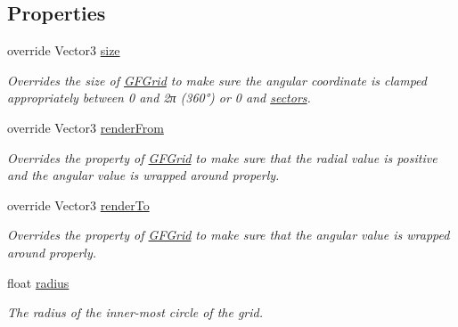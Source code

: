\subsection*{Properties}
\begin{DoxyCompactItemize}
\item 
override Vector3 \hyperlink{class_g_f_polar_grid_a851ff16bfbf1204a1ab0b1b4de3ceb35_a851ff16bfbf1204a1ab0b1b4de3ceb35}{size}
\begin{DoxyCompactList}\small\item\em Overrides the size of \hyperlink{class_g_f_grid}{G\+F\+Grid} to make sure the angular coordinate is clamped appropriately between 0 and 2π (360°) or 0 and \hyperlink{class_g_f_polar_grid_a10ed1b65007dca14afb8fb6d22d36de0_a10ed1b65007dca14afb8fb6d22d36de0}{sectors}.\end{DoxyCompactList}\item 
override Vector3 \hyperlink{class_g_f_polar_grid_a9f4b9bcd687f29d56f4aafa74655e27b_a9f4b9bcd687f29d56f4aafa74655e27b}{render\+From}
\begin{DoxyCompactList}\small\item\em Overrides the property of \hyperlink{class_g_f_grid}{G\+F\+Grid} to make sure that the radial value is positive and the angular value is wrapped around properly.\end{DoxyCompactList}\item 
override Vector3 \hyperlink{class_g_f_polar_grid_a81cc21991e689a1e74821d1f2870852e_a81cc21991e689a1e74821d1f2870852e}{render\+To}
\begin{DoxyCompactList}\small\item\em Overrides the property of \hyperlink{class_g_f_grid}{G\+F\+Grid} to make sure that the angular value is wrapped around properly.\end{DoxyCompactList}\item 
float \hyperlink{class_g_f_polar_grid_a71bf429c8c2630684969db7f7483416a_a71bf429c8c2630684969db7f7483416a}{radius}
\begin{DoxyCompactList}\small\item\em The radius of the inner-\/most circle of the grid.\end{DoxyCompactList}\item 

\end{DoxyCompactItemize}
